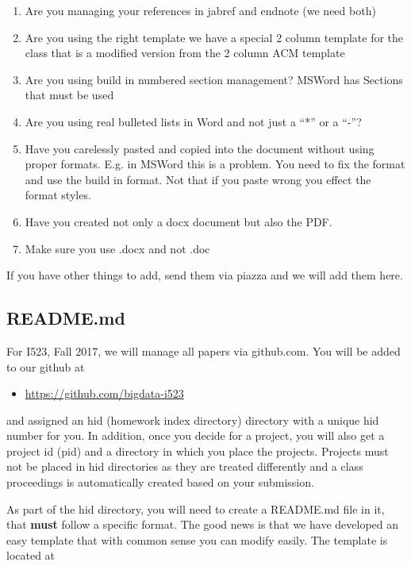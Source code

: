 \begin{enumerate}

\item
  Are you managing your references in jabref and endnote (we need both)
\item
  Are you using the right template we have a special 2 column template
  for the class that is a modified version from the 2 column ACM
  template
\item
  Are you using build in numbered section management? MSWord has
  Sections that must be used
\item
  Are you using real bulleted lists in Word and not just a ``*'' or a
  ``-''?
\item
  Have you carelessly pasted and copied into the document without using
  proper formats. E.g. in MSWord this is a problem. You need to fix the
  format and use the build in format. Not that if you paste wrong you
  effect the format styles.
\item
  Have you created not only a docx document but also the PDF.
\item
  Make sure you use .docx and not .doc
\end{enumerate}

If you have other things to add, send them via piazza and we will add
them here.

\subsection{README.md}\label{readme.md}

For I523, Fall 2017, we will manage all papers via github.com. You will
be added to our github at

\begin{itemize}

\item
  \url{https://github.com/bigdata-i523}
\end{itemize}

and assigned an hid (homework index directory) directory with a unique
hid number for you. In addition, once you decide for a project, you will
also get a project id (pid) and a directory in which you place the
projects. Projects must not be placed in hid directories as they are
treated differently and a class proceedings is automatically created
based on your submission.

As part of the hid directory, you will need to create a README.md file
in it, that \textbf{must} follow a specific format. The good news is
that we have developed an easy template that with common sense you can
modify easily. The template is located at

